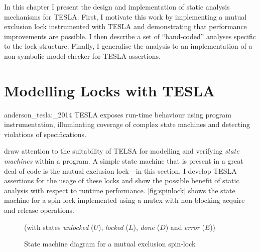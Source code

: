 In this chapter I present the design and implementation of static
analysis mechanisms for TESLA. First, I motivate this work by
implementing a mutual exclusion lock instrumented with TESLA and
demonstrating that performance improvements are possible. I then
describe a set of ``hand-coded'' analyses specific to the lock
structure. Finally, I generalise the analysis to an implementation of a
non-symbolic model checker for TESLA assertions.

\section{Modelling Locks with TESLA} \label{sec:locks}

\begin{displaycquote}[p. 1]{anderson_tesla:_2014}
TESLA exposes run-time behaviour using program instrumentation, illuminating
coverage of complex state machines and detecting violations of specifications.
\end{displaycquote}

\textcite{anderson_tesla:_2014} draw attention to the suitability of
TELSA for modelling and verifying \emph{state machines} within a
program. A simple state machine that is present in a great deal of code
is the mutual exclusion lock---in this section, I develop TESLA
assertions for the usage of these locks and show the possible benefit of
static analysis with respect to runtime performance.
\autoref{fig:spinlock} shows the state machine for a spin-lock
implemented using a mutex with non-blocking acquire and release
operations.

\begin{figure}
  \centering
  \caption{State machine diagram for a mutual exclusion spin-lock}{(with
  states \emph{unlocked} ($U$), \emph{locked} ($L$),
  \emph{done} ($D$) and \emph{error} ($E$))}
  \label{fig:spinlock}
\end{figure}

